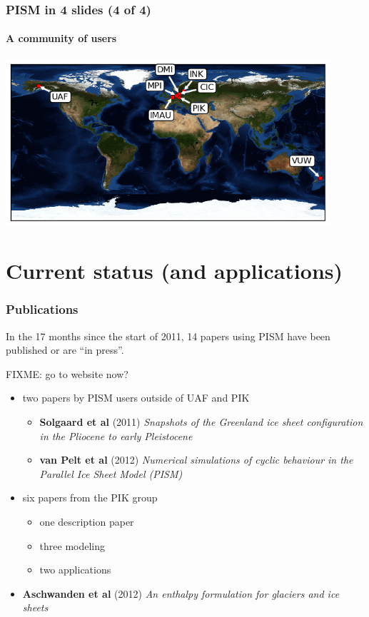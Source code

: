 \documentclass[hide notes,intlimits]{beamer}
\begin{document}
\begin{frame}
  \frametitle{PISM in 4 slides (4 of 4)}
  \framesubtitle{A community of users}
 \begin{center}
    \includegraphics[width=120mm]{pism-users-map.png}
  \end{center}
\end{frame}

\section[Current status]{Current status (and applications)}

\begin{frame}
  \frametitle{Publications}

  In the 17 months since the start of 2011, 14 papers using PISM have been published or are ``in press''.

FIXME: go to website now?
  \begin{itemize}
  \item two papers by PISM users outside of UAF and PIK
    \begin{itemize}
    \item \textbf{Solgaard et al} (2011) \emph{Snapshots of
        the Greenland ice sheet configuration in the Pliocene to early
        Pleistocene}
    \item \textbf{van Pelt et al} (2012) \emph{Numerical
        simulations of cyclic behaviour in the Parallel Ice Sheet Model
        (PISM)}
    \end{itemize}
  \item six papers from the PIK group
    \begin{itemize}
    \item one description paper
    \item three modeling
    \item two applications
    \end{itemize}
  \item \textbf{Aschwanden et al} (2012) \emph{An enthalpy
      formulation for glaciers and ice sheets}
  \end{itemize}

\end{frame}
\end{document}
